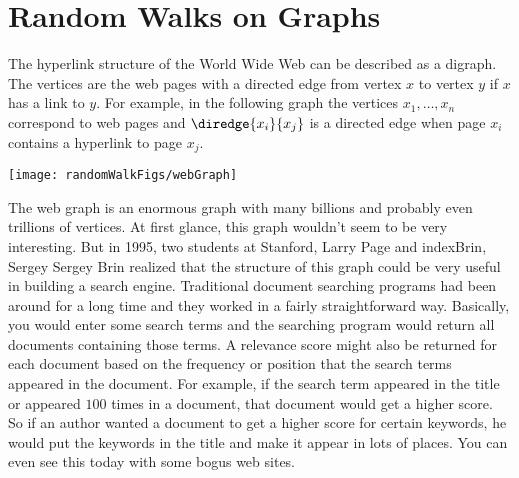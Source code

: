 \begin{problems}
\classproblems
{}

\end{problems}


\section{Random Walks on Graphs}\label{Google_sec}

\begin{editingnotes}


\end{editingnotes}

The hyperlink structure of the World Wide Web can be described as a
digraph.  The vertices are the web pages with a directed edge from vertex
$x$ to vertex $y$ if $x$ has a link to $y$.  For example, in the following
graph the vertices $x_1, \ldots, x_n$ correspond to web pages and
$\diredge{x_i}{x_j}$ is a directed edge when page $x_i$ contains a
hyperlink to page $x_j$.

\texttt{[image: randomWalkFigs/webGraph]}

The web graph is an enormous graph with many billions and probably even
trillions of vertices.  At first glance, this graph wouldn't seem to be very
interesting.  But in 1995, two students at Stanford, 
Larry Page and index{Brin, Sergey} Sergey Brin realized that the structure
of this graph could be very useful in building a search engine.
Traditional document searching programs had been around for a long time
and they worked in a fairly straightforward way.  Basically, you would
enter some search terms and the searching program would return all
documents containing those terms.  A relevance score might also be
returned for each document based on the frequency or position that the
search terms appeared in the document.  For example, if the search term
appeared in the title or appeared $100$ times in a document, that document
would get a higher score.  So if an author wanted a document to get a
higher score for certain keywords, he would put the keywords in the title
and make it appear in lots of places.  You can even see this today with
some bogus web sites.

